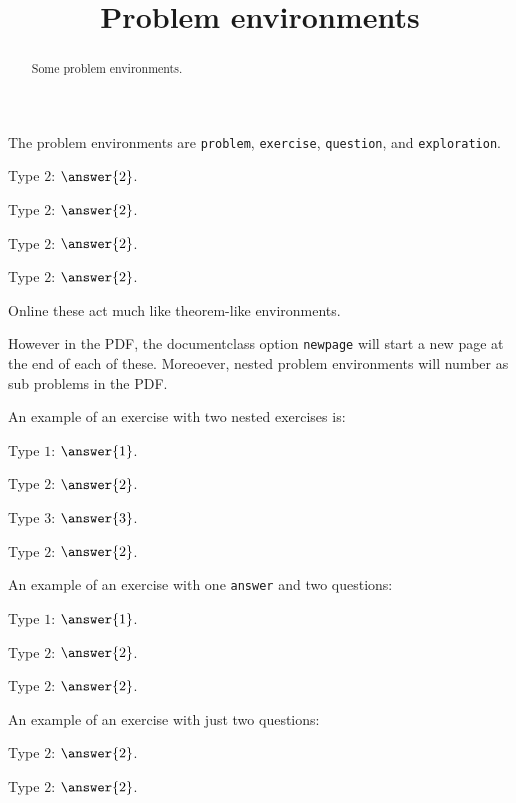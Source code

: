 \documentclass{ximera}
\title{Problem environments \CurrentFile}
\begin{document}
\begin{abstract}
  Some problem environments.
\end{abstract}
\maketitle

The problem environments are \verb|problem|, \verb|exercise|, \verb|question|, and \verb|exploration|.


\begin{exercise}
  Type $2$: $\answer{2}$.
\end{exercise}

\begin{problem}
  Type $2$: $\answer{2}$.
\end{problem}

\begin{question}
  Type $2$: $\answer{2}$.
\end{question}

\begin{exploration}
  Type $2$: $\answer{2}$.
\end{exploration}

Online these act much like theorem-like environments.

However in the PDF, the documentclass option \verb|newpage| will start
a new page at the end of each of these. Moreoever, nested problem
environments will number as sub problems in the PDF.

An example of an exercise with two nested exercises is:
\begin{exercise}
  Type $1$: $\answer{1}$.
  \begin{exercise}
    Type $2$: $\answer{2}$.
    \begin{exercise}
      Type $3$: $\answer{3}$.
    \end{exercise}
  \end{exercise}
  \begin{exercise}
    Type $2$: $\answer{2}$.
  \end{exercise}
\end{exercise}


An example of an exercise with one \verb|answer| and two questions:

\begin{exercise}
  Type $1$: $\answer{1}$.
  \begin{question}
    Type $2$: $\answer{2}$.
  \end{question}
  \begin{question}
    Type $2$: $\answer{2}$.
  \end{question}
\end{exercise}

An example of an exercise with just two questions:

\begin{exercise}
  \begin{question}
    Type $2$: $\answer{2}$.
  \end{question}
  \begin{question}
    Type $2$: $\answer{2}$.
  \end{question}
\end{exercise}
\end{document}
